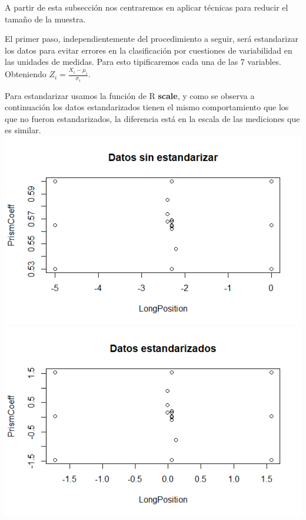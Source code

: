 \documentclass[twoside]{article}
\begin{document}
\begin{multicols}{2}
A partir de esta subsecci\'on nos centraremos en aplicar t\'ecnicas para reducir el tama\~no de la muestra.

El primer paso, independientemente del procedimiento a seguir, ser\'a estandarizar los datos para evitar errores en la clasificaci\'on por cuestiones de variabilidad en las unidades de medidas. Para esto tipificaremos cada una de las 7 variables. Obteniendo
$Z_i = \frac{X_i - \mu_i}{\sigma_i}$.

Para estandarizar usamos la funci\'on de R \textbf{scale}, y como se observa a continuaci\'on los datos estandarizados tienen el mismo comportamiento que los que no fueron estandarizados, la diferencia est\'a en la escala de las mediciones que es similar.\\

\includegraphics[scale = 0.4]{images/pic_27.png} \\
\includegraphics[scale = 0.4]{images/pic_28.png} \\


\end{multicols}
\end{document}
